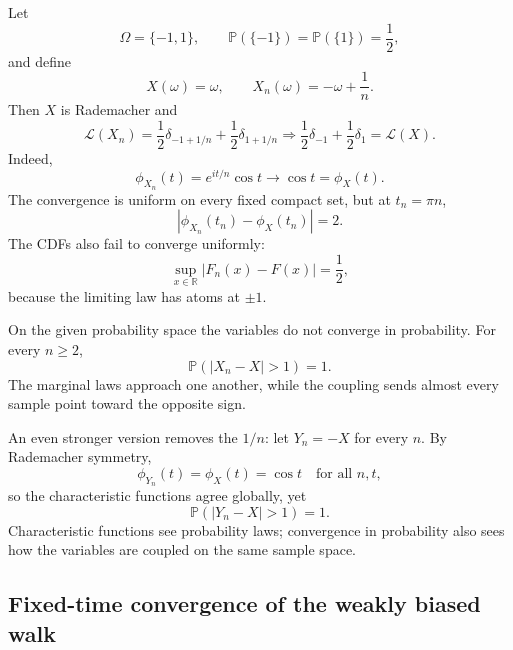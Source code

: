 \documentclass[10pt,a4paper]{article}
\numberwithin{equation}{section}
\theoremstyle{blueplain}
\theoremstyle{definition}
\newcommand{\Pp}{\mathbb P}
\newcommand{\R}{\mathbb R}
\begin{document}
Let
\[
  \Omega=\{-1,1\},
  \qquad
  \Pp(\{-1\})=\Pp(\{1\})=\frac12,
\]
and define
\begin{equation}
  X(\omega)=\omega,
  \qquad
  X_n(\omega)=-\omega+\frac1n.
  \label{eq:rademacher-coupling}
\end{equation}
Then \(X\) is Rademacher and
\[
  \mathcal L(X_n)
  =\frac12\delta_{-1+1/n}+\frac12\delta_{1+1/n}
  \Rightarrow
  \frac12\delta_{-1}+\frac12\delta_1
  =\mathcal L(X).
\]
Indeed,
\begin{equation}
  \phi_{X_n}(t)=e^{it/n}\cos t
  \longrightarrow\cos t=\phi_X(t).
  \label{eq:rademacher-coupling-cf}
\end{equation}
The convergence is uniform on every fixed compact set, but at \(t_n=\pi n\),
\[
  |\phi_{X_n}(t_n)-\phi_X(t_n)|=2.
\]
The CDFs also fail to converge uniformly:
\begin{equation}
  \sup_{x\in\R}|F_n(x)-F(x)|=\frac12,
  \label{eq:rademacher-cdf-gap}
\end{equation}
because the limiting law has atoms at \(\pm1\).

On the given probability space the variables do not converge in probability.
For every \(n\ge2\),
\begin{equation}
  \Pp(|X_n-X|>1)=1.
  \label{eq:weak-not-probability}
\end{equation}
The marginal laws approach one another, while the coupling sends almost every
sample point toward the opposite sign.

An even stronger version removes the \(1/n\): let \(Y_n=-X\) for every \(n\).
By Rademacher symmetry,
\[
  \phi_{Y_n}(t)=\phi_X(t)=\cos t
  \quad\text{for all }n,t,
\]
so the characteristic functions agree globally, yet
\[
  \Pp(|Y_n-X|>1)=1.
\]
Characteristic functions see probability laws; convergence in probability
also sees how the variables are coupled on the same sample space.

\subsection{Fixed-time convergence of the weakly biased walk}
\end{document}

